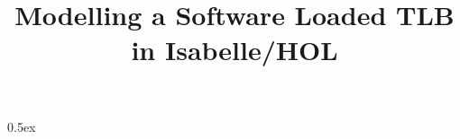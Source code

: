 \documentclass[11pt,a4paper]{book}
\begin{document}
\title{Modelling a Software Loaded TLB in Isabelle/HOL }
\maketitle

\tableofcontents


\newpage

\renewcommand{\setisabellecontext}[1]{\markright{THEORY~``#1''}}

\parindent 0pt\parskip 0.5ex


\pagestyle{headings}


\end{document}

